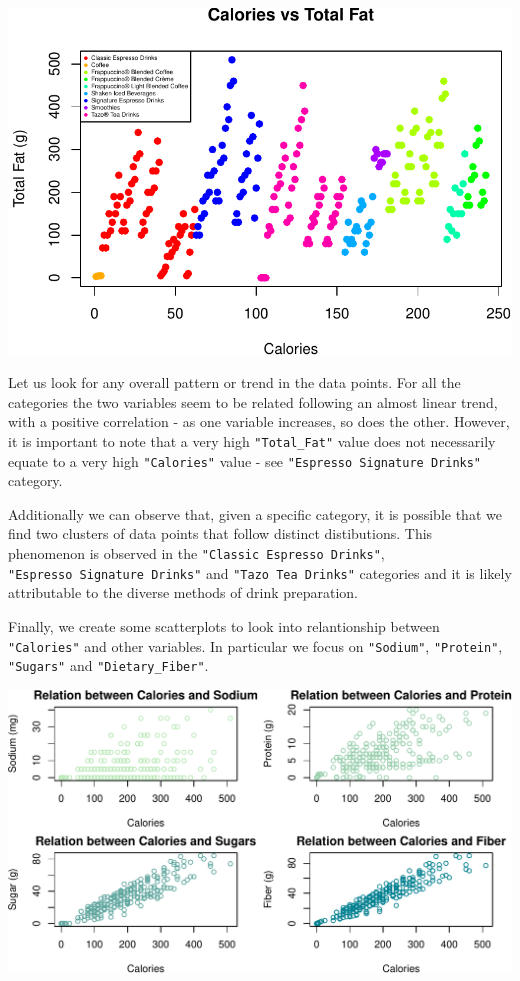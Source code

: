 \documentclass[
]{article}
\begin{document}
\begin{center}\includegraphics{Statistical_Learning_Final_Report_files/figure-latex/fat_comparison-1} \end{center}

Let us look for any overall pattern or trend in the data points. For all
the categories the two variables seem to be related following an almost
linear trend, with a positive correlation - as one variable increases,
so does the other. However, it is important to note that a very high
\texttt{"Total\_Fat"} value does not necessarily equate to a very high
\texttt{"Calories"} value - see \texttt{"Espresso\ Signature\ Drinks"}
category.

Additionally we can observe that, given a specific category, it is
possible that we find two clusters of data points that follow distinct
distibutions. This phenomenon is observed in the
\texttt{"Classic\ Espresso\ Drinks"},
\texttt{"Espresso\ Signature\ Drinks"} and \texttt{"Tazo\ Tea\ Drinks"}
categories and it is likely attributable to the diverse methods of drink
preparation.

Finally, we create some scatterplots to look into relantionship between
\texttt{"Calories"} and other variables. In particular we focus on
\texttt{"Sodium"}, \texttt{"Protein"}, \texttt{"Sugars"} and
\texttt{"Dietary\_Fiber"}.

\begin{center}\includegraphics{Statistical_Learning_Final_Report_files/figure-latex/scatterplot-1} \end{center}
\end{document}
